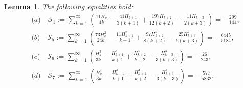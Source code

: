 \documentclass[10pt]{amsart}
\newtheorem{lemma}{Lemma}
\theoremstyle{definition}
\begin{document}
\begin{lemma} \label{TelescopingLemma}
The following equalities hold:
\begin{align*}
    &\textit{(a)}\quad \mathcal{S}_4 := \sum_{k=1}^\infty \left(\frac{11 H_k}{4 k} -\frac{41 H_{k+1}}{3 (k+1)} + \frac{197 H_{k+2}}{12 (k+2)} - \frac{11 H_{k+3}}{2 (k+3)}\right) = -\frac{299}{144},\\
    &\textit{(b)}\quad \mathcal{S}_5 := \sum_{k=1}^\infty \left(\frac{73 H_k^2}{24 k} - \frac{11 H_{k+1}^2}{k+1} +\frac{97 H_{k+2}^2}{8 (k+2)} - \frac{25 H_{k+3}^2}{6 (k+3)}\right) = -\frac{6445}{5184},\\
    &\textit{(c)}\quad \mathcal{S}_6 := \sum_{k=1}^\infty \left(\frac{H_k^3}{3 k} - \frac{H_{k+1}^3}{k+1} + \frac{H_{k+2}^3}{k+2} -\frac{H_{k+3}^3}{3 (k+3)}\right) = -\frac{26}{243},\\
    &\textit{(d)}\quad \mathcal{S}_7 := \sum_{k=1}^\infty \left(\frac{H_k^4}{3 k} - \frac{H_{k+1}^4}{k+1} + \frac{H_{k+2}^4}{k+2} - \frac{H_{k+3}^4}{3 (k+3)}\right) = -\frac{577}{5832}.
\end{align*}
\end{lemma}
\end{document}
